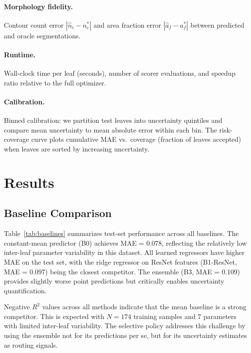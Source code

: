 \documentclass[11pt,a4paper]{article}
\begin{document}
\paragraph{Morphology fidelity.}
Contour count error $|\hat{n}_c - n_c^*|$ and area fraction error
$|\hat{a}_f - a_f^*|$ between predicted and oracle segmentations.

\paragraph{Runtime.}
Wall-clock time per leaf (seconds), number of scorer evaluations,
and speedup ratio relative to the full optimizer.

\paragraph{Calibration.}
Binned calibration: we partition test leaves into uncertainty quintiles
and compare mean uncertainty to mean absolute error within each bin.
The risk-coverage curve plots cumulative MAE vs.\ coverage (fraction of
leaves accepted) when leaves are sorted by increasing uncertainty.

\section{Results}
\label{sec:results}

\subsection{Baseline Comparison}

Table~\ref{tab:baselines} summarizes test-set performance across all baselines.
The constant-mean predictor (B0) achieves MAE = 0.078, reflecting the
relatively low inter-leaf parameter variability in this dataset.
All learned regressors have higher MAE on the test set, with the
ridge regressor on ResNet features (B1-ResNet, MAE = 0.097) being the
closest competitor. The ensemble (B3, MAE = 0.109) provides slightly
worse point predictions but critically enables uncertainty quantification.

Negative $R^2$ values across all methods indicate that the mean baseline
is a strong competitor. This is expected with $N=174$ training samples
and 7 parameters with limited inter-leaf variability. The selective policy
addresses this challenge by using the ensemble not for its predictions
per se, but for its uncertainty estimates as routing signals.
\end{document}
